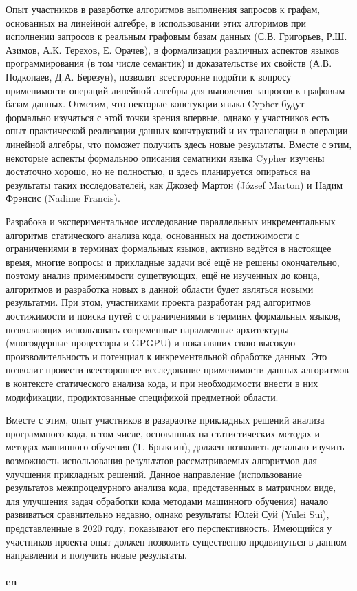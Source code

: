 \documentclass[12pt]{article}  %
\theoremstyle{remark}
\begin{document}
Опыт участников в разарботке алгоритмов выполнения запросов к графам, основанных на линейной алгебре, в использовании этих алгоримов при исполнении запросов к реальным графовым базам данных (С.В. Григорьев, Р.Ш. Азимов, А.К. Терехов, Е. Орачев), в формализации различных аспектов языков программирования (в том числе семантик) и доказательстве их свойств (А.В. Подкопаев, Д.А. Березун), позволят всесторонне подойти к вопросу применимости операций линейной алгебры для выполения запросов к графовым базам данных. Отметим, что некторые констукции языка Cypher будут формально изучаться с этой точки зрения впервые, однако у участников есть опыт практической реализации данных кончтрукций и их трансляции в операции линейной алгебры, что поможет получить здесь новые результаты. Вместе с этим, некоторые аспекты формальноо описания сематники языка Cypher изучены достаточно хорошо, но не полностью, и здесь планируется опираться на результаты таких исследователей, как Джозеф Мартон (József Marton) и Надим Фрэнсис (Nadime Francis).

Разрабока и экспериментальное исследование параллельных инкрементальных алгоритмв статического анализа кода, основанных на достижимости с ограничениями в терминах формальных языков, активно ведётся в настоящее время, многие вопросы и прикладные задачи всё ещё не решены окончательно, поэтому анализ применимости сущетвующих, ещё не изученных до конца, алгоритмов и разработка новых в данной области будет являться новыми результатми. При этом, участниками проекта разработан ряд алгоритмов достижимости и поиска путей с ограничениями в терминх формальных языков, позволяющих использовать современные параллелные архитектуры (многоядерные процессоры и GPGPU) и показавших свою высокую произволительность и потенциал к инкрементальной обработке данных. Это позволит провести всестороннее исследование применимости данных алгоритмов в контексте статического анализа кода, и при необходимости внести в них модификации, продиктованные спецификой предметной области. 

Вместе с этим, опыт участников в разараотке прикладных решений анализа программного кода, в том числе, основанных на статистических методах и методах машинного обучения (Т. Брыксин), должен позволить детально изучить возможность использования результатов рассматриваемых алгоритмов для улучшения прикладных решений. Данное направление (использование результатов межпроцедурного анализа кода, представенных в матричном виде, для улучшения задач обработки кода методами машинного обучения) начало развиваться сравнительно недавно, однако результаты Юлей Суй (Yulei Sui), представленные в 2020 году, показывают его перспективность. Имеющийся у участников проекта опыт должен позволить существенно продвинуться в данном направлении и получить новые результаты.
\\
\\
\textbf{en}\\
\end{document}

